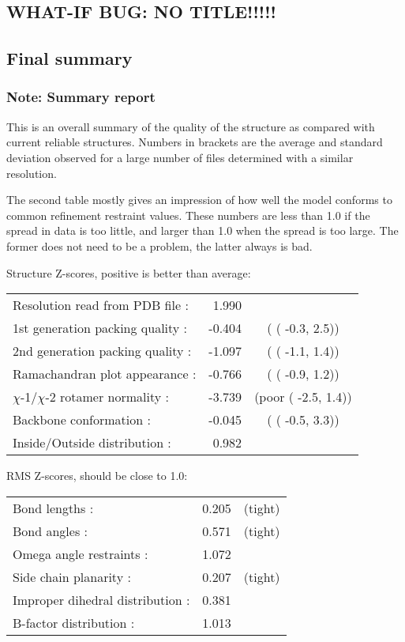 \documentclass[a4paper]{article}
\def\showsect#1{
  \thesect\gdef\thesect{}
  \thessect\gdef\thessect{}
  \subsubsection{#1}
}
\def\ssect#1{
  \gdef\thessect{\subsection{#1}}
}
\gdef\thesect{\pagebreak[2]\section{WHAT-IF BUG: NO TITLE!!!!!}}
\gdef\thessect{\subsection{General}}
\begin{document}
\ssect{Final summary}
\begin{note}
\showsect{Note: Summary report}
This is an overall summary of the quality of the structure as compared with
current reliable structures. Numbers in brackets are the average and standard
deviation observed for a large number of files determined with a similar
resolution.
 
The second table mostly gives an impression of how well the model conforms
to common refinement restraint values. These numbers are less than 1.0 if the
spread in data is too little, and larger than 1.0 when the spread is too
large. The former does not need to be a problem, the latter always is bad.
 
\parbox{1\textwidth}{
 
 Structure Z-scores, positive is better than average:
 
\begin{tabular}{lrc}
  Resolution read from PDB file  :&   1.990\\
  1st generation packing quality :&  -0.404& (          (  -0.3,  2.5))\\
  2nd generation packing quality :&  -1.097& (          (  -1.1,  1.4))\\
  Ramachandran plot appearance   :&  -0.766& (          (  -0.9,  1.2))\\
  $\chi$-1/$\chi$-2 rotamer normality  :&  -3.739& (poor      (  -2.5,  1.4))\\
  Backbone conformation          :&  -0.045& (          (  -0.5,  3.3))\\
  Inside/Outside distribution    :&   0.982\\
\end{tabular}
 
 
 RMS Z-scores, should be close to 1.0:
 
\begin{tabular}{lrc}
  Bond lengths                   :&   0.205& (tight)\\
  Bond angles                    :&   0.571& (tight)\\
  Omega angle restraints         :&   1.072\\
  Side chain planarity           :&   0.207& (tight)\\
  Improper dihedral distribution :&   0.381\\
  B-factor distribution          :&   1.013\\
\end{tabular}
}%
 
\end{note}
\end{document}
